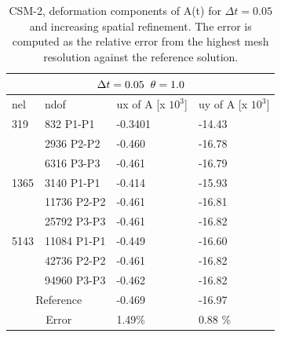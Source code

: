 \begin{table}[h!]
\centering
\label{CSM 2 Results}
\begin{tabular}{ |p{1cm}||p{2.7cm}|p{3.3cm}|p{3.3cm}|}
\hline
  \multicolumn{4}{|c|}{$\Delta t = 0.05 \hspace{2mm} \theta = 1.0$} \\
\hline
nel & ndof & ux of A [x $10^{3}$]  &uy of A [x $10^{3}$] \\
\hline

 319     & 832 P1-P1  & -0.3401 &  -14.43  \\ 
     & 2936 P2-P2 &  -0.460  &  -16.78  \\ 
      & 6316 P3-P3 & -0.461 &  -16.79  \\
        \hline
  1365    & 3140 P1-P1  &  -0.414 &  -15.93\\
     & 11736 P2-P2 &  -0.461 &  -16.81 \\
     & 25792 P3-P3 & -0.461  &  -16.82 \\
        \hline
   5143    & 11084 P1-P1 & -0.449 &  -16.60  \\
     & 42736 P2-P2 &-0.461 &  -16.82 \\
     & 94960 P3-P3 & -0.462 &  -16.82 \\
  \hline
  \multicolumn{2}{|c|}{Reference}  & -0.469      & -16.97  \\
   \hline
    \multicolumn{2}{|c|}{Error}  & 1.49\%   & 0.88 \%\\
   \hline
\end{tabular}
\caption{CSM-2, deformation components of A(t) for $\Delta t = 0.05$ and increasing spatial refinement. The error is computed as the relative error from the highest mesh resolution against the reference solution.}
\end{table}

\newpage

